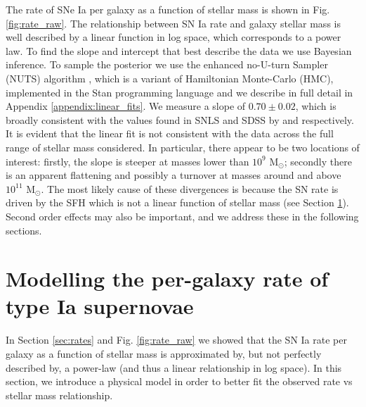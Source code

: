 \documentclass[fleqn,usenatbib]{mnras}
\begin{document}
The rate of SNe Ia per galaxy as a function of stellar mass is shown in Fig. \ref{fig:rate_raw}. The relationship between SN Ia rate and galaxy stellar mass is well described by a linear function in log space, which corresponds to a power law. To find the slope and intercept that best describe the data we use Bayesian inference. To sample the posterior we use the enhanced no-U-turn Sampler (NUTS) algorithm \citep{Betancourt2017}, which is a variant of Hamiltonian Monte-Carlo (HMC), implemented in the Stan programming language \citep{Carpenter2017} and we describe in full detail in Appendix \ref{appendix:linear_fits}. We measure a slope of $0.70\pm0.02$, which is broadly consistent with the values found in SNLS and SDSS by \citet{Sullivan2006} and \citet{Smith2012} respectively. It is evident that the linear fit is not consistent with the data across the full range of stellar mass considered. In particular, there appear to be two locations of interest: firstly, the slope is steeper at masses lower than $10^9$ M$_{\odot}$; secondly there is an apparent flattening and possibly a turnover at masses around and above $10^{11}$ M$_{\odot}$. The most likely cause of these divergences is because the SN rate is driven by the SFH which is not a linear function of stellar mass (see Section \ref{sec:model}). Second order effects may also be important, and we address these in the following sections.

\section{Modelling the per-galaxy rate of type Ia supernovae}
 \label{sec:model}
 
In Section \ref{sec:rates} and Fig. \ref{fig:rate_raw} we showed that the SN Ia rate per galaxy as a function of stellar mass is approximated by, but not perfectly described by, a power-law (and thus a linear relationship in log space). In this section, we introduce a physical model in order to better fit the observed rate vs stellar mass relationship. 
\end{document}
